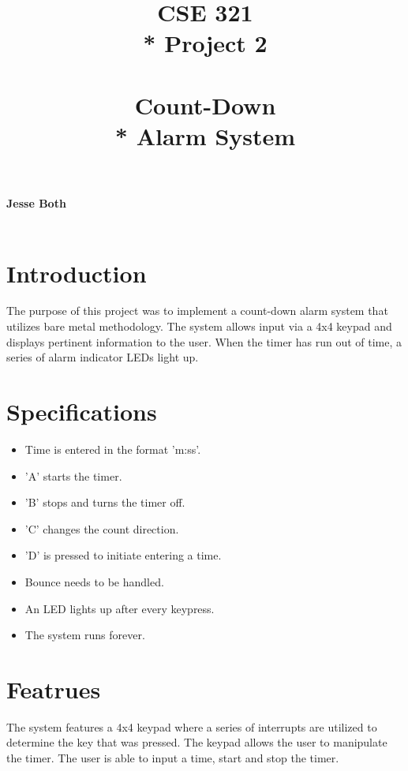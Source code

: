 \documentclass{article}
\title{\Huge{\textbf{CSE 321}  \\* Project 2 \\~\\ \textbf{Count-Down \\* Alarm System}}}
\date{} %
\begin{document}
    \maketitle
    \vfill 
    {\Large\centering\textbf{Jesse Both  \\~\\}\par}

    {\Large{}\par}
    {\large\centering{\today}\par}

    \newpage
    \begin{center}
        \tableofcontents
    \end{center}
\newpage
\setcounter{secnumdepth}{-1}


\section{Introduction}
The purpose of this project was to implement a count-down alarm system that utilizes bare metal methodology.
The system allows input via a 4x4 keypad and displays pertinent information to the user.  When the timer has 
run out of time, a series of alarm indicator LEDs light up.
\newline

\section{Specifications}

\begin{itemize}
    \item Time is entered in the format 'm:ss'.
    \item 'A' starts the timer.
    \item 'B' stops and turns the timer off.
    \item 'C' changes the count direction.
    \item 'D' is pressed to initiate entering a time.
    \item Bounce needs to be handled.
    \item An LED lights up after every keypress.
    \item The system runs forever.
  \end{itemize}

\section{Featrues}
The system features a 4x4 keypad where a series of interrupts are utilized to determine the key that was
pressed.  The keypad allows the user to manipulate the timer.  The user is able to input a time, start and 
stop the timer.
\newline
\end{document}

